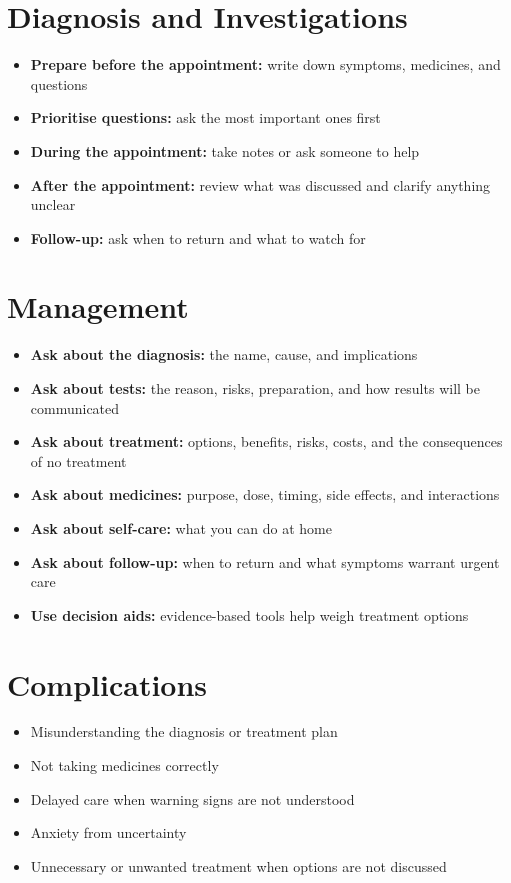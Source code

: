 \section*{Diagnosis and Investigations}
\begin{itemize}
    \item \textbf{Prepare before the appointment:} write down symptoms, medicines, and questions
    \item \textbf{Prioritise questions:} ask the most important ones first
    \item \textbf{During the appointment:} take notes or ask someone to help
    \item \textbf{After the appointment:} review what was discussed and clarify anything unclear
    \item \textbf{Follow-up:} ask when to return and what to watch for
\end{itemize}

\section*{Management}
\begin{itemize}
    \item \textbf{Ask about the diagnosis:} the name, cause, and implications
    \item \textbf{Ask about tests:} the reason, risks, preparation, and how results will be communicated
    \item \textbf{Ask about treatment:} options, benefits, risks, costs, and the consequences of no treatment
    \item \textbf{Ask about medicines:} purpose, dose, timing, side effects, and interactions
    \item \textbf{Ask about self-care:} what you can do at home
    \item \textbf{Ask about follow-up:} when to return and what symptoms warrant urgent care
    \item \textbf{Use decision aids:} evidence-based tools help weigh treatment options
\end{itemize}

\section*{Complications}
\begin{itemize}
    \item Misunderstanding the diagnosis or treatment plan
    \item Not taking medicines correctly
    \item Delayed care when warning signs are not understood
    \item Anxiety from uncertainty
    \item Unnecessary or unwanted treatment when options are not discussed
\end{itemize}

